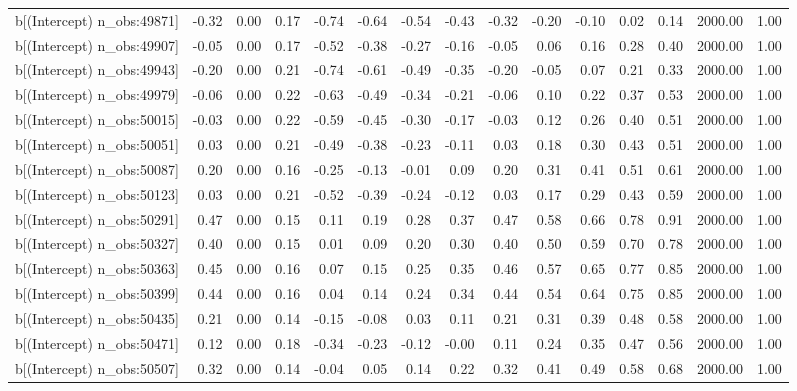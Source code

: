 \begin{table}[ht]
\begin{tabular}{rrrrrrrrrrrrrrr}
  b[(Intercept) n\_obs:49871] & -0.32 & 0.00 & 0.17 & -0.74 & -0.64 & -0.54 & -0.43 & -0.32 & -0.20 & -0.10 & 0.02 & 0.14 & 2000.00 & 1.00 \\ 
  b[(Intercept) n\_obs:49907] & -0.05 & 0.00 & 0.17 & -0.52 & -0.38 & -0.27 & -0.16 & -0.05 & 0.06 & 0.16 & 0.28 & 0.40 & 2000.00 & 1.00 \\ 
  b[(Intercept) n\_obs:49943] & -0.20 & 0.00 & 0.21 & -0.74 & -0.61 & -0.49 & -0.35 & -0.20 & -0.05 & 0.07 & 0.21 & 0.33 & 2000.00 & 1.00 \\ 
  b[(Intercept) n\_obs:49979] & -0.06 & 0.00 & 0.22 & -0.63 & -0.49 & -0.34 & -0.21 & -0.06 & 0.10 & 0.22 & 0.37 & 0.53 & 2000.00 & 1.00 \\ 
  b[(Intercept) n\_obs:50015] & -0.03 & 0.00 & 0.22 & -0.59 & -0.45 & -0.30 & -0.17 & -0.03 & 0.12 & 0.26 & 0.40 & 0.51 & 2000.00 & 1.00 \\ 
  b[(Intercept) n\_obs:50051] & 0.03 & 0.00 & 0.21 & -0.49 & -0.38 & -0.23 & -0.11 & 0.03 & 0.18 & 0.30 & 0.43 & 0.51 & 2000.00 & 1.00 \\ 
  b[(Intercept) n\_obs:50087] & 0.20 & 0.00 & 0.16 & -0.25 & -0.13 & -0.01 & 0.09 & 0.20 & 0.31 & 0.41 & 0.51 & 0.61 & 2000.00 & 1.00 \\ 
  b[(Intercept) n\_obs:50123] & 0.03 & 0.00 & 0.21 & -0.52 & -0.39 & -0.24 & -0.12 & 0.03 & 0.17 & 0.29 & 0.43 & 0.59 & 2000.00 & 1.00 \\ 
  b[(Intercept) n\_obs:50291] & 0.47 & 0.00 & 0.15 & 0.11 & 0.19 & 0.28 & 0.37 & 0.47 & 0.58 & 0.66 & 0.78 & 0.91 & 2000.00 & 1.00 \\ 
  b[(Intercept) n\_obs:50327] & 0.40 & 0.00 & 0.15 & 0.01 & 0.09 & 0.20 & 0.30 & 0.40 & 0.50 & 0.59 & 0.70 & 0.78 & 2000.00 & 1.00 \\ 
  b[(Intercept) n\_obs:50363] & 0.45 & 0.00 & 0.16 & 0.07 & 0.15 & 0.25 & 0.35 & 0.46 & 0.57 & 0.65 & 0.77 & 0.85 & 2000.00 & 1.00 \\ 
  b[(Intercept) n\_obs:50399] & 0.44 & 0.00 & 0.16 & 0.04 & 0.14 & 0.24 & 0.34 & 0.44 & 0.54 & 0.64 & 0.75 & 0.85 & 2000.00 & 1.00 \\ 
  b[(Intercept) n\_obs:50435] & 0.21 & 0.00 & 0.14 & -0.15 & -0.08 & 0.03 & 0.11 & 0.21 & 0.31 & 0.39 & 0.48 & 0.58 & 2000.00 & 1.00 \\ 
  b[(Intercept) n\_obs:50471] & 0.12 & 0.00 & 0.18 & -0.34 & -0.23 & -0.12 & -0.00 & 0.11 & 0.24 & 0.35 & 0.47 & 0.56 & 2000.00 & 1.00 \\ 
  b[(Intercept) n\_obs:50507] & 0.32 & 0.00 & 0.14 & -0.04 & 0.05 & 0.14 & 0.22 & 0.32 & 0.41 & 0.49 & 0.58 & 0.68 & 2000.00 & 1.00 \\ 

\end{tabular}
\end{table}
